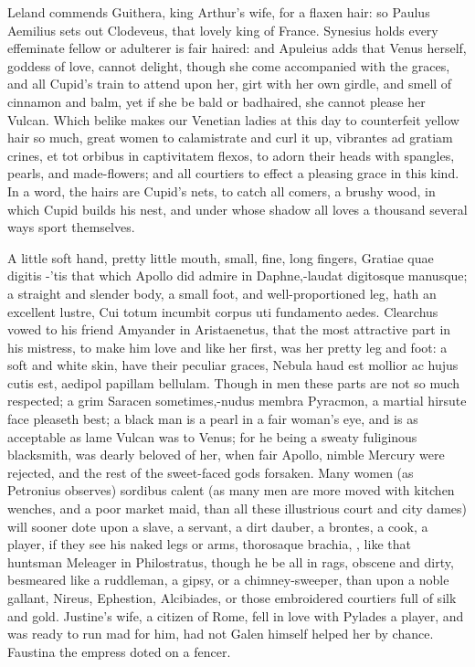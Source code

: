 {Leland commends Guithera, king Arthur's wife, for a flaxen hair: so
Paulus Aemilius sets out Clodeveus, that lovely king of France.
Synesius holds every effeminate fellow or adulterer is fair
haired: and Apuleius adds that Venus herself, goddess of love, cannot
delight, though she come accompanied with the graces, and all
Cupid's train to attend upon her, girt with her own girdle, and smell
of cinnamon and balm, yet if she be bald or badhaired, she cannot
please her Vulcan. Which belike makes our Venetian ladies at this day
to counterfeit yellow hair so much, great women to calamistrate and
curl it up, vibrantes ad gratiam crines, et tot orbibus in captivitatem
flexos, to adorn their heads with spangles, pearls, and made-flowers;
and all courtiers to effect a pleasing grace in this kind. In a word,
the hairs are Cupid's nets, to catch all comers, a brushy wood,
in which Cupid builds his nest, and under whose shadow all loves a
thousand several ways sport themselves.

A little soft hand, pretty little mouth, small, fine, long fingers,
Gratiae quae digitis -'tis that which Apollo did admire in
Daphne,-laudat digitosque manusque; a straight and slender body, a
small foot, and well-proportioned leg, hath an excellent lustre,
Cui totum incumbit corpus uti fundamento aedes. Clearchus vowed
to his friend Amyander in Aristaenetus, that the most attractive
part in his mistress, to make him love and like her first, was her
pretty leg and foot: a soft and white skin, \etc{} have their peculiar
graces, Nebula haud est mollior ac hujus cutis est, aedipol
papillam bellulam. Though in men these parts are not so much respected;
a grim Saracen sometimes,-nudus membra Pyracmon, a martial hirsute face
pleaseth best; a black man is a pearl in a fair woman's eye, and is as
acceptable as lame Vulcan was to Venus; for he being a sweaty
fuliginous blacksmith, was dearly beloved of her, when fair Apollo,
nimble Mercury were rejected, and the rest of the sweet-faced gods
forsaken. Many women (as Petronius observes) sordibus calent (as
many men are more moved with kitchen wenches, and a poor market maid,
than all these illustrious court and city dames) will sooner dote upon
a slave, a servant, a dirt dauber, a brontes, a cook, a player, if they
see his naked legs or arms, thorosaque brachia, \etc{}, like that
huntsman Meleager in Philostratus, though he be all in rags, obscene
and dirty, besmeared like a ruddleman, a gipsy, or a chimney-sweeper,
than upon a noble gallant, Nireus, Ephestion, Alcibiades, or those
embroidered courtiers full of silk and gold. Justine's wife, a
citizen of Rome, fell in love with Pylades a player, and was ready to
run mad for him, had not Galen himself helped her by chance. Faustina
the empress doted on a fencer.

}
